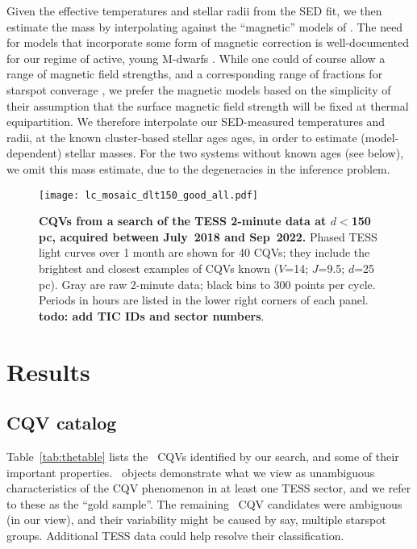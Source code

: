 \documentclass[11pt,twocolumn,tighten]{aastex63}
\begin{document}
Given the effective temperatures and stellar radii from the SED fit,
we then estimate the mass by interpolating against the ``magnetic''
models of \citet{2016A&A...593A..99F}.  The need for models that
incorporate some form of magnetic correction is well-documented for
our regime of active, young M-dwarfs
\citep[e.g.][]{2012ApJ...756...47S,2015ApJ...804..146D,2020ApJ...891...29S}.
While one could of course allow a range of magnetic field strengths,
and a corresponding range of fractions for starspot converage
\citep{2020ApJ...891...29S}, we prefer the magnetic
\citet{2016A&A...593A..99F} models based on the simplicity of their
assumption that the surface magnetic field strength will be fixed at
thermal equipartition.
We therefore interpolate our SED-measured temperatures and radii, at
the known cluster-based stellar ages ages, in order to estimate
(model-dependent) stellar masses.
For the two systems without known ages (see below), we omit this mass
estimate, due to the degeneracies in the inference problem.



\begin{figure*}[!t]
	\begin{center}
		\centering
		\texttt{[image: lc\_mosaic\_dlt150\_good\_all.pdf]}
		\caption{
			{\bf CQVs from a search of the TESS 2-minute data at
				$d$$<$150\,pc, acquired between July~2018 and Sep~2022.}
			Phased TESS light curves over 1 month are shown for 40 CQVs;
			they include the brightest and closest examples of CQVs known
			($V$=14; $J$=9.5; $d$=25\,pc).  Gray are raw 2-minute data;
			black bins to 300 points per cycle.  Periods in hours are listed
			in the lower right corners of each panel.
			{\bf todo:  add TIC IDs and sector numbers}.
		}
		\label{fig:singlemosaic}
	\end{center}
\end{figure*}


\section{Results}
\label{sec:results}

\subsection{CQV catalog}

Table~\ref{tab:thetable} lists the \ncpvsfound\ CQVs identified by our
search, and some of their important properties.  \ngoods\ objects
demonstrate what we view as unambiguous characteristics of the CQV
phenomenon in at least one TESS sector, and we refer to these as the
``gold sample''.  The remaining \nmaybes\ CQV candidates were
ambiguous (in our view), and their variability might be caused by say,
multiple starspot groups.  Additional TESS data could help resolve
their classification.
\end{document}
